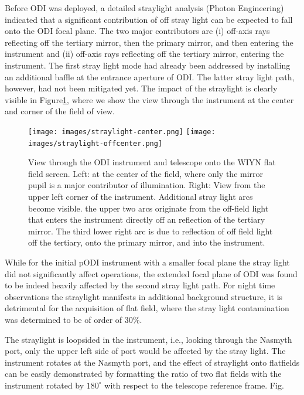 \documentclass[draft]{spieman}
\begin{document}
Before ODI was deployed, a detailed straylight analysis (Photon Engineering)
indicated that a significant contribution of off stray light can be expected to
fall onto the ODI focal plane. The two major contributors are (i) off-axis rays
reflecting off the tertiary mirror, then the primary mirror, and then entering
the instrument and (ii) off-axis rays reflecting off the tertiary mirror,
entering the instrument. The first stray light mode had already been addressed
by installing an additional baffle at the entrance aperture of ODI. The latter
stray light path, however, had not been mitigated yet. The impact of the
straylight is clearly visible in Figure\ref{fig_straylight}, where we show the
view through the instrument at the center and corner of the field of view.


\begin{figure}[h]
	\texttt{[image: images/straylight-center.png]}
	\texttt{[image: images/straylight-offcenter.png]}
	\caption{\label{fig_straylight} View through the ODI instrument and telescope
		onto the WIYN flat field screen. Left: at the center of the field, where only
		the mirror pupil is a major contributor of illumination. Right: View from the
		upper left corner of the instrument. Additional stray light arcs become visible.
		the upper two arcs originate from the off-field light that enters the instrument
		directly off an reflection of the tertiary mirror. The third lower right arc is 
		due to reflection of off field light off the tertiary, onto the primary mirror,
		and  into the instrument. } 
\end{figure}


While for the initial pODI instrument with a smaller focal plane the stray
light did not significantly affect operations, the extended focal plane of
ODI was found to be indeed heavily affected by the second stray light path.
For night time observations the straylight manifests in additional
background structure, it is detrimental for the acquisition of flat field,
where the stray light contamination was determined to be of order of 30\%.




The straylight is loopsided in the instrument, i.e., looking through the
Nasmyth port, only the upper left side of port would be affected by the
stray light. The instrument rotates at the Nasmyth port, and the effect of
straylight onto flatfields can be easily demonstrated by formatting the ratio
of two flat fields with the instrument rotated by $180^\circ$ with respect
to the telescope reference frame. Fig. \label{fig_flatfieldbaffle}
\end{document}
